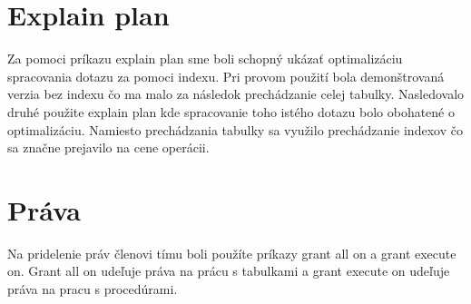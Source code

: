 \documentclass[11pt]{article}
\begin{document}
\section{Explain plan}
Za pomoci príkazu explain plan sme boli schopný ukázať optimalizáciu spracovania dotazu za pomoci indexu.
Pri provom použití bola demonštrovaná verzia bez indexu čo ma malo za následok prechádzanie celej tabulky.
Nasledovalo druhé použite explain plan kde spracovanie toho istého dotazu bolo obohatené o optimalizáciu.
Namiesto prechádzania tabulky sa využilo prechádzanie  indexov čo sa značne prejavilo na cene operácii.

\section{Práva}
Na pridelenie práv členovi tímu boli použíte príkazy grant all on a grant execute on.
Grant all on udeľuje práva na prácu s tabulkami a grant execute on udeľuje práva na pracu s procedúrami.
\end{document}

